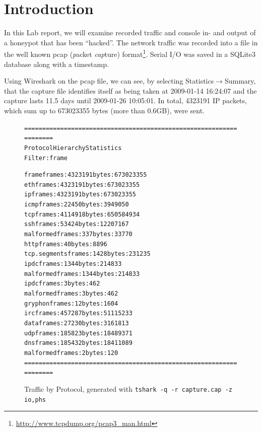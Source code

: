 \documentclass[a4paper,
    11pt,
    normalheadings,
    parindent,
    UKenglish,
    abstracton,
    ]{scrartcl}
\title{\mytitle{}}
\author{
    cand. Dipl. Inf. Tobias Müller <\href{mailto:muellet2@computing.dcu.ie?subject=ss10-forensic-lab08}{muellet2@}>, 59212333 \and
    BSc. Anthony Walters <\href{mailto:waltera3@computing.dcu.ie?subject=ss10-forensic-lab08}{waltera3@}>, 59213102 \and Conor Lynch <\href{mailto:conor.lynch36@mail.dcu.ie}{lynchc36@}>, 55619599}
\date{\today}
\begin{document}
\maketitle


\section{Introduction} \label{sec:intro}
In this Lab report, we will examine recorded traffic and console in- and output of a honeypot that has been ``hacked''.
The network traffic was recorded into a file in the well known pcap (\emph{p}acket \emph{cap}ture) format\footnote{\url{http://www.tcpdump.org/pcap3_man.html}}.
Serial I/O was saved in a SQLite3 database along with a timestamp.

Using Wireshark on the pcap file, we can see, by selecting Statistics$\rightarrow$Summary, that the capture file identifies itself as being taken at 2009-01-14 16:24:07 and the capture lasts 11.5 days until 2009-01-26 10:05:01.
In total, 4323191 IP packets, which sum up to 673023355 bytes (more than 0.6GB),   were sent.


\begin{figure}
\begin{alltt}
===================================================================
Protocol Hierarchy Statistics
Filter: frame

frame                                    frames:4323191 bytes:673023355
  eth                                    frames:4323191 bytes:673023355
    ip                                   frames:4323191 bytes:673023355
      icmp                               frames:22450 bytes:3949050
      tcp                                frames:4114918 bytes:650584934
        ssh                              frames:53424 bytes:12207167
          malformed                      frames:337 bytes:33770
        http                             frames:40 bytes:8896
        tcp.segments                     frames:1428 bytes:231235
          ipdc                           frames:1344 bytes:214833
            malformed                    frames:1344 bytes:214833
              ipdc                       frames:3 bytes:462
                malformed                frames:3 bytes:462
          gryphon                        frames:12 bytes:1604
        irc                              frames:457287 bytes:51115233
        data                             frames:27230 bytes:3161813
      udp                                frames:185823 bytes:18489371
        dns                              frames:185432 bytes:18411089
          malformed                      frames:2 bytes:120
===================================================================
\end{alltt}
  \caption{Traffic by Protocol, generated with \texttt{tshark -q -r capture.cap -z io,phs}}
  \label{protocol-hierachy}
\end{figure}
\end{document}
